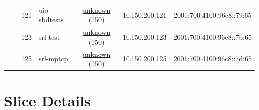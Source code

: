 \begin{small}
\begin{center}
\begin{longtable}{|c|c|c|c|c|c|c|c|}
  &  & \tiny{121} & \multicolumn{1}{|l|}{\tiny{uio-sbdtests}} & \multicolumn{2}{|c|}{\tiny{\href{}{unknown} (150)}} & \tiny{10.150.200.121} & \tiny{2001:700:4100:96c8::79:65} \\* \cline{3-3}\cline{4-4}\cline{5-5}\cline{6-6}\cline{7-7}\cline{8-8}
  &  & \tiny{123} & \multicolumn{1}{|l|}{\tiny{srl-test}} & \multicolumn{2}{|c|}{\tiny{\href{}{unknown} (150)}} & \tiny{10.150.200.123} & \tiny{2001:700:4100:96c8::7b:65} \\* \cline{3-3}\cline{4-4}\cline{5-5}\cline{6-6}\cline{7-7}\cline{8-8}
  &  & \tiny{125} & \multicolumn{1}{|l|}{\tiny{srl-mptcp}} & \multicolumn{2}{|c|}{\tiny{\href{}{unknown} (150)}} & \tiny{10.150.200.125} & \tiny{2001:700:4100:96c8::7d:65} \\ \hline
\end{longtable}
\end{center}
\end{small}




\chapter{Slice Details}
\label{cha:Slice-Details}


